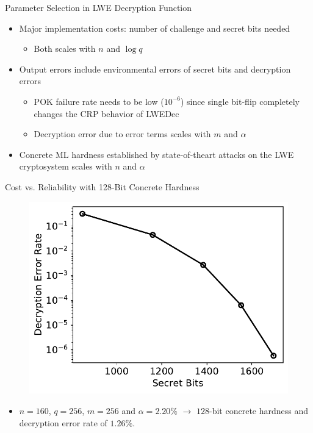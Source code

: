\begin{frame}{Parameter Selection in LWE Decryption Function}
\begin{itemize}
\item Major implementation costs: number of challenge and secret bits needed 
    \begin{itemize}
        \item Both scales with $n$ and $\log q$
    \end{itemize}
\item Output errors include environmental errors of secret bits and decryption errors
     \begin{itemize}
        \item POK failure rate needs to be low ($10^{-6}$) since single bit-flip completely changes the CRP behavior of LWEDec
        \item Decryption error due to error terms scales with $m$ and $\alpha$
    \end{itemize}   
\item Concrete ML hardness established by state-of-theart attacks on the LWE cryptosystem scales with $n$ and $\alpha$
\end{itemize}
\end{frame}

\begin{frame}{Cost vs. Reliability with 128-Bit Concrete Hardness}
\begin{figure}
\centering
\includegraphics[width=.7\linewidth]{fig/DecErrVsSecretBits.pdf}
\end{figure}   
\begin{itemize}
    \item $n = 160$, $q = 256$, $m = 256$ and $\alpha = 2.20\%$ $\rightarrow$ $128$-bit concrete hardness and decryption error rate of $1.26\%$.
\end{itemize}
\end{frame}

